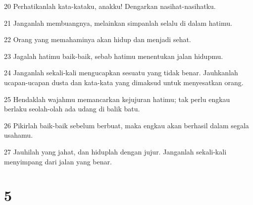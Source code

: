 \par 20 Perhatikanlah kata-kataku, anakku! Dengarkan nasihat-nasihatku.
\par 21 Janganlah membuangnya, melainkan simpanlah selalu di dalam hatimu.
\par 22 Orang yang memahaminya akan hidup dan menjadi sehat.
\par 23 Jagalah hatimu baik-baik, sebab hatimu menentukan jalan hidupmu.
\par 24 Janganlah sekali-kali mengucapkan sesuatu yang tidak benar. Jauhkanlah ucapan-ucapan dusta dan kata-kata yang dimaksud untuk menyesatkan orang.
\par 25 Hendaklah wajahmu memancarkan kejujuran hatimu; tak perlu engkau berlaku seolah-olah ada udang di balik batu.
\par 26 Pikirlah baik-baik sebelum berbuat, maka engkau akan berhasil dalam segala usahamu.
\par 27 Jauhilah yang jahat, dan hiduplah dengan jujur. Janganlah sekali-kali menyimpang dari jalan yang benar.

\chapter{5}


